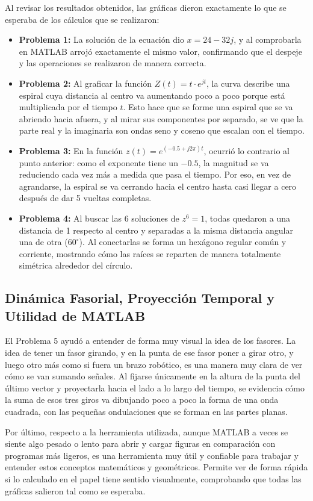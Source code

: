 \documentclass[11pt,a4paper]{article}
\begin{document}
Al revisar los resultados obtenidos, las gráficas dieron exactamente lo que se esperaba de los cálculos que se realizaron:
\begin{itemize}
    \item \textbf{Problema 1:} La solución de la ecuación dio $x = 24 - 32j$, y al comprobarla en MATLAB arrojó exactamente el mismo valor, confirmando que el despeje y las operaciones se realizaron de manera correcta.
    \item \textbf{Problema 2:} Al graficar la función $Z(t) = t \cdot e^{jt}$, la curva describe una espiral cuya distancia al centro va aumentando poco a poco porque está multiplicada por el tiempo $t$. Esto hace que se forme una espiral que se va abriendo hacia afuera, y al mirar sus componentes por separado, se ve que la parte real y la imaginaria son ondas seno y coseno que escalan con el tiempo.
    \item \textbf{Problema 3:} En la función $z(t) = e^{(-0.5 + j2\pi)t}$, ocurrió lo contrario al punto anterior: como el exponente tiene un $-0.5$, la magnitud se va reduciendo cada vez más a medida que pasa el tiempo. Por eso, en vez de agrandarse, la espiral se va cerrando hacia el centro hasta casi llegar a cero después de dar 5 vueltas completas.
    \item \textbf{Problema 4:} Al buscar las 6 soluciones de $z^6 = 1$, todas quedaron a una distancia de 1 respecto al centro y separadas a la misma distancia angular una de otra ($60^\circ$). Al conectarlas se forma un hexágono regular común y corriente, mostrando cómo las raíces se reparten de manera totalmente simétrica alrededor del círculo.
\end{itemize}

\subsection{Dinámica Fasorial, Proyección Temporal y Utilidad de MATLAB}
El Problema 5 ayudó a entender de forma muy visual la idea de los fasores. La idea de tener un fasor girando, y en la punta de ese fasor poner a girar otro, y luego otro más como si fuera un brazo robótico, es una manera muy clara de ver cómo se van sumando señales. Al fijarse únicamente en la altura de la punta del último vector y proyectarla hacia el lado a lo largo del tiempo, se evidencia cómo la suma de esos tres giros va dibujando poco a poco la forma de una onda cuadrada, con las pequeñas ondulaciones que se forman en las partes planas.

Por último, respecto a la herramienta utilizada, aunque MATLAB a veces se siente algo pesado o lento para abrir y cargar figuras en comparación con programas más ligeros, es una herramienta muy útil y confiable para trabajar y entender estos conceptos matemáticos y geométricos. Permite ver de forma rápida si lo calculado en el papel tiene sentido visualmente, comprobando que todas las gráficas salieron tal como se esperaba.
\end{document}
